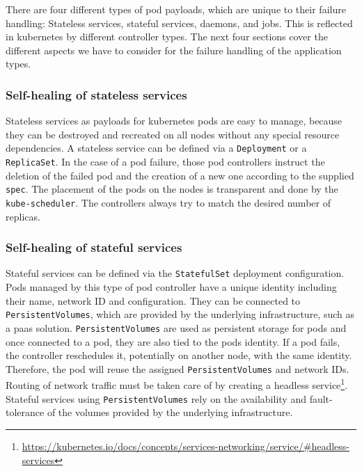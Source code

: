   There are four different types of pod payloads, which are unique to their failure handling:
  Stateless services, stateful services, daemons, and jobs.
  This is reflected in \gls{kubernetes} by different controller types.
  The next four sections cover the different aspects we have to consider for the failure handling of the application types.

  \subsubsection{Self-healing of stateless services}
    Stateless services as payloads for \gls{kubernetes} pods are easy to manage, because they can be destroyed and recreated on all nodes without any special resource dependencies.
    A stateless service can be defined via a \texttt{Deployment} or a \texttt{ReplicaSet}.
    In the case of a pod failure, those \glspl{pod controller} instruct the deletion of the failed pod and the creation of a new one according to the supplied \texttt{spec}.
    The placement of the pods on the nodes is transparent and done by the \texttt{kube-scheduler}.
    The controllers always try to match the desired number of replicas.

  \subsubsection{Self-healing of stateful services}
    Stateful services can be defined via the \texttt{StatefulSet} deployment configuration.
    Pods managed by this type of \gls{pod controller} have a unique identity including their name, network ID and configuration.
    They can be connected to \texttt{PersistentVolumes}, which are provided by the underlying infrastructure, such as a \gls{paas} solution.
    \texttt{PersistentVolumes} are used as persistent storage for pods and once connected to a pod, they are also tied to the pods identity.
    If a pod fails, the controller reschedules it, potentially on another node, with the same identity.
    Therefore, the pod will reuse the assigned \texttt{PersistentVolumes} and network IDs.
    Routing of network traffic must be taken care of by creating a headless \gls{service}\footnote{\url{https://kubernetes.io/docs/concepts/services-networking/service/\#headless-services}}.
    Stateful services using \texttt{PersistentVolumes} rely on the availability and fault-tolerance of the volumes provided by the underlying infrastructure.

